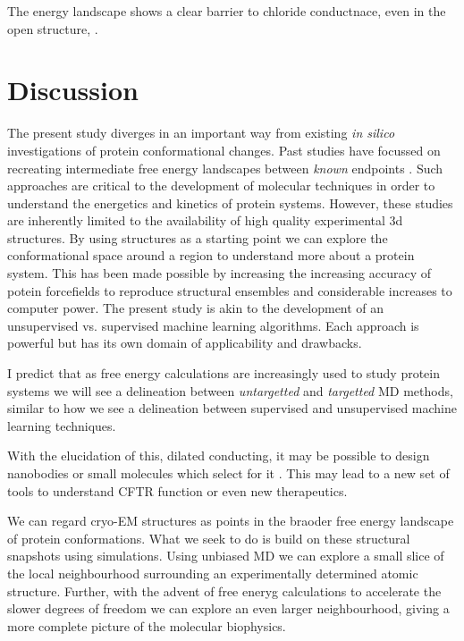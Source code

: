 The energy landscape shows a clear barrier to chloride conductnace, even in the open structure, .

\section{Discussion}

The present study diverges in an important way from existing \textit{in silico} investigations of protein conformational changes. Past studies have focussed on recreating intermediate free energy landscapes between \textit{known} endpoints \cite{lev2020, bergh2021, moradi2015}. Such approaches are critical to the development of molecular techniques in order to understand the energetics and kinetics of protein systems. However, these studies are inherently limited to the availability of high quality experimental 3d structures. By using structures as a starting point we can explore the conformational space around a region to understand more about a protein system. This has been made possible by increasing the increasing accuracy of potein forcefields to reproduce structural ensembles \cite{huang2016} and considerable increases to computer power. The present study is akin to the development of an unsupervised vs. supervised machine learning algorithms. Each approach is powerful but has its own domain of applicability and drawbacks. 

I predict that as free energy calculations are increasingly used to study protein systems we will see a delineation between \textit{untargetted} and \textit{targetted} MD methods, similar to how we see a delineation between supervised and unsupervised machine learning techniques.

With the elucidation of this, dilated conducting, it may be possible to design nanobodies or small molecules which select for it \cite{hutter2019}. This may lead to a new set of tools to understand CFTR function or even new therapeutics. 

We can regard cryo-EM structures as points in the braoder free energy landscape of protein conformations. What we seek to do is build on these structural snapshots using simulations. Using unbiased MD we can explore a small slice of the local neighbourhood surrounding an experimentally determined atomic structure. Further, with the advent of free eneryg calculations to accelerate the slower degrees of freedom we can explore an even larger neighbourhood, giving a more complete picture of the molecular biophysics. 

